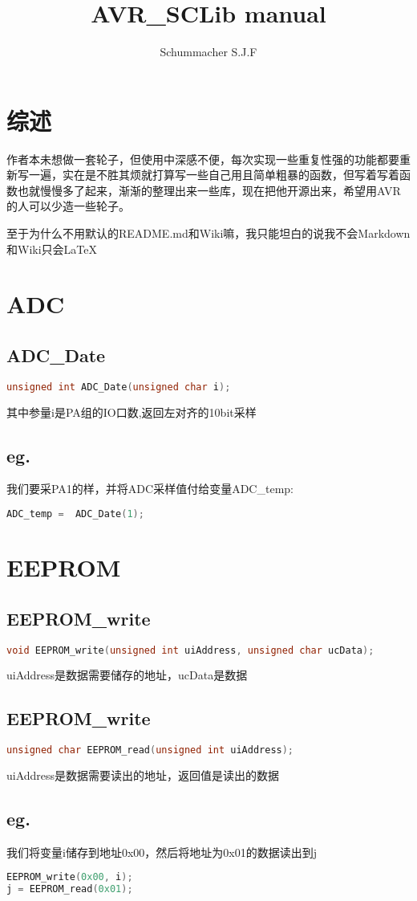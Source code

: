 \documentclass{article}
\title{AVR\_SCLib manual}
\begin{document}
\author{Schummacher S.J.F}
\maketitle
\newpage
\tableofcontents
\newpage
\section{综述}
作者本未想做一套轮子，但使用中深感不便，每次实现一些重复性强的功能都要重新写一遍，实在是不胜其烦就打算写一些自己用且简单粗暴的函数，但写着写着函数也就慢慢多了起来，渐渐的整理出来一些库，现在把他开源出来，希望用AVR的人可以少造一些轮子。\par
至于为什么不用默认的README.md和Wiki嘛，我只能坦白的说我不会Markdown和Wiki只会\LaTeX
\section{ADC}
\subsection{ADC\_Date}
\begin{lstlisting}[language=C]
unsigned int ADC_Date(unsigned char i);
\end{lstlisting}
其中参量i是PA组的IO口数,返回左对齐的10bit采样
\subsection{eg.}
我们要采PA1的样，并将ADC采样值付给变量ADC\_temp:
\begin{lstlisting}[language=C]
ADC_temp =  ADC_Date(1);
\end{lstlisting}
\section{EEPROM}
\subsection{EEPROM\_write}
\begin{lstlisting}[language=C]
void EEPROM_write(unsigned int uiAddress, unsigned char ucData);
\end{lstlisting}
uiAddress是数据需要储存的地址，ucData是数据
\subsection{EEPROM\_write}
\begin{lstlisting}[language=C]
unsigned char EEPROM_read(unsigned int uiAddress);
\end{lstlisting}
uiAddress是数据需要读出的地址，返回值是读出的数据
\subsection{eg.}
我们将变量i储存到地址0x00，然后将地址为0x01的数据读出到j
\begin{lstlisting}[language=C]
EEPROM_write(0x00, i);
j = EEPROM_read(0x01);
\end{lstlisting}
\end{document}
